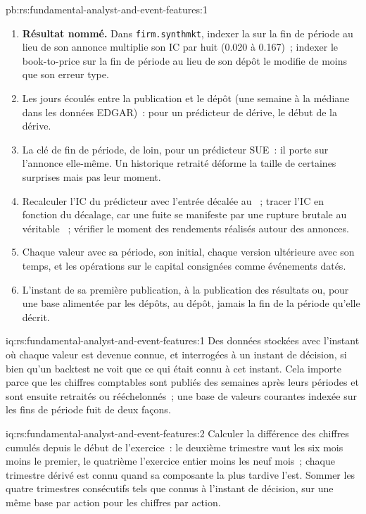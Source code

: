 \begin{solution}{pb:rs:fundamental-analyst-and-event-features:1}
\begin{enumerate}
\item \textbf{Résultat nommé.} Dans \texttt{firm.synthmkt}, indexer la  sur la fin de période au lieu de son annonce multiplie
son IC par huit (0.020 à 0.167)~; indexer le book-to-price sur la fin de période au lieu de son dépôt le modifie de moins que son erreur type.
\item Les jours écoulés entre la publication et le dépôt (une semaine à la médiane dans les données EDGAR)~: pour un prédicteur de dérive, le début de la dérive.
\item La clé de fin de période, de loin, pour un prédicteur SUE~: il porte sur l'annonce elle-même. Un historique retraité déforme la taille de certaines surprises
mais pas leur moment.
\item Recalculer l'IC du prédicteur avec l'entrée décalée au ~; tracer l'IC en fonction du décalage, car une fuite se manifeste par une
rupture brutale au véritable ~; vérifier le moment des rendements réalisés autour des annonces.
\item Chaque valeur avec sa période, son  initial, chaque version ultérieure avec son temps, et les opérations sur le capital consignées comme événements datés.
\item L'instant de sa première publication, à la publication des résultats ou, pour une base alimentée par les dépôts, au dépôt, jamais la fin de la période qu'elle décrit.
\end{enumerate}
\end{solution}

\begin{solution}{iq:rs:fundamental-analyst-and-event-features:1}
Des données stockées avec l'instant où chaque valeur est devenue connue, et interrogées à un instant de décision, si bien qu'un backtest ne voit que ce qui était connu à cet instant. Cela importe
parce que les chiffres comptables sont publiés des semaines après leurs périodes et sont ensuite retraités ou rééchelonnés~; une base de valeurs courantes indexée sur
les fins de période fuit de deux façons.
\end{solution}

\begin{solution}{iq:rs:fundamental-analyst-and-event-features:2}
Calculer la différence des chiffres cumulés depuis le début de l'exercice~: le deuxième trimestre vaut les six mois moins le premier, le quatrième l'exercice entier moins les neuf mois~; chaque
trimestre dérivé est connu quand sa composante la plus tardive l'est. Sommer les quatre trimestres consécutifs tels que connus à l'instant de décision, sur une même base par action pour les chiffres par action.
\end{solution}

